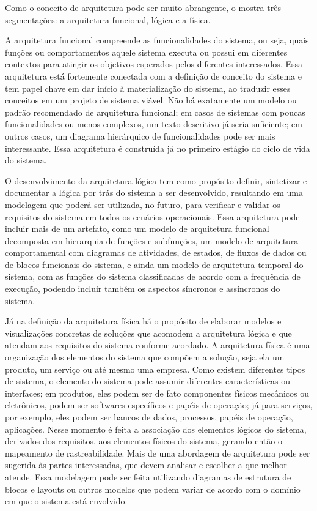 	Como o conceito de arquitetura pode ser muito abrangente, o \cite{sebok2024} mostra três segmentações: a arquitetura funcional, lógica e a física.

	A arquitetura funcional compreende as funcionalidades do sistema, ou seja, quais funções ou comportamentos 
	aquele sistema executa ou possui em diferentes contextos para atingir os objetivos esperados pelos diferentes interessados.
	Essa arquitetura está fortemente conectada com a definição de conceito do sistema e tem papel chave em dar início à materialização do sistema,
	ao traduzir esses conceitos em um projeto de sistema viável. Não há exatamente um modelo ou padrão recomendado de
	arquitetura funcional; em casos de sistemas com poucas funcionalidades ou menos complexos, um texto descritivo já seria 
	suficiente; em outros casos, um diagrama hierárquico de funcionalidades pode ser mais interessante. Essa arquitetura é 
	construída já no primeiro estágio do ciclo de vida do sistema.

	O desenvolvimento da arquitetura lógica tem como propósito definir, sintetizar e documentar a lógica por trás do sistema a ser desenvolvido,
	resultando em uma modelagem que poderá ser utilizada, no futuro, para verificar e validar os requisitos do sistema em todos os cenários operacionais.
	Essa arquitetura pode incluir mais de um artefato, como um modelo de arquitetura funcional decomposta em hierarquia de funções e subfunções, um modelo de arquitetura comportamental com diagramas
	de atividades, de estados, de fluxos de dados ou de blocos funcionais do sistema, e ainda um modelo de arquitetura temporal do sistema, com as funções do sistema 
	classificadas de acordo com a frequência de execução, podendo incluir também os aspectos síncronos e assíncronos do sistema.

	Já na definição da arquitetura física há o propósito de elaborar modelos e visualizações concretas de soluções que acomodem a arquitetura
	lógica e que atendam aos requisitos do sistema conforme acordado. A arquitetura física é uma organização dos elementos do sistema
	que compõem a solução, seja ela um produto, um serviço ou até mesmo uma empresa. Como existem diferentes tipos de sistema, o elemento do sistema pode
	assumir diferentes características ou interfaces; em produtos, eles podem ser de fato componentes físicos mecânicos ou eletrônicos, podem ser softwares
	específicos e papéis de operação; já para serviços, por exemplo, eles podem ser bancos de dados, processos, papéis de operação, aplicações.
	Nesse momento é feita a associação dos elementos lógicos do sistema, derivados dos requisitos, aos elementos físicos do sistema, gerando então o mapeamento de rastreabilidade.
	Mais de uma abordagem de arquitetura pode ser sugerida às partes interessadas, que devem analisar e escolher a que melhor atende. Essa modelagem pode ser feita utilizando
	diagramas de estrutura de blocos e layouts ou outros modelos que podem variar de acordo com o domínio em que o sistema está envolvido.

